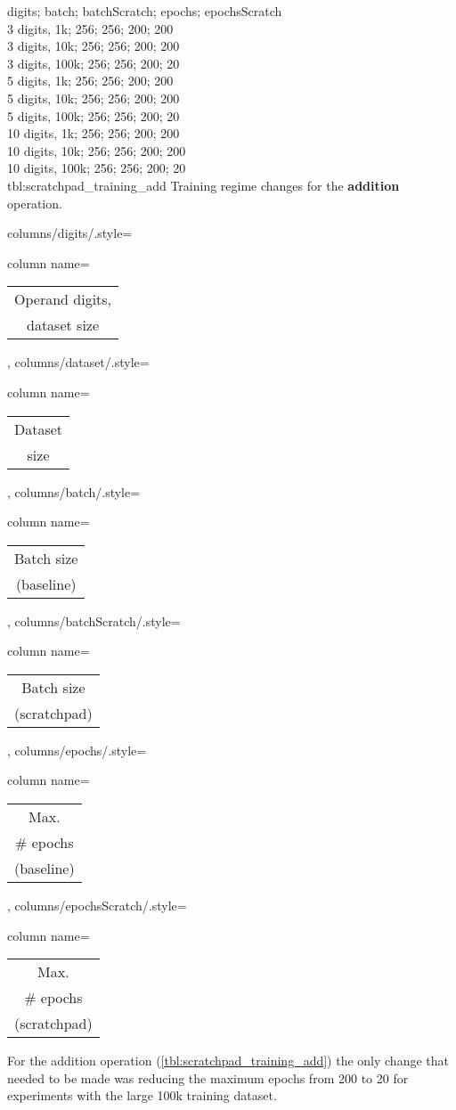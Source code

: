 {
    digits; batch; batchScratch; epochs; epochsScratch\\
    3 digits,  1k;  256; 256; 200; 200\\
    3 digits,  10k;  256; 256; 200; 200\\
    3 digits,  100k;  256; 256; 200; 20\\
    5 digits,  1k;  256; 256; 200; 200\\
    5 digits,  10k;  256; 256; 200; 200\\
    5 digits,  100k;  256; 256; 200; 20\\
    10 digits,  1k;  256; 256; 200; 200\\
    10 digits,  10k;  256; 256; 200; 200\\
    10 digits,  100k;  256; 256; 200; 20\\
}
{tbl:scratchpad_training_add}
{
    Training regime changes for the \textbf{addition} operation.
}
{%
    columns/digits/.style={column name={\begin{tabular}{c}
         Operand digits, \\
         dataset size
    \end{tabular}}},
    columns/dataset/.style={column name={\begin{tabular}{c}
         Dataset \\
         size
    \end{tabular}}},
    columns/batch/.style={column name={\begin{tabular}{c}
         Batch size \\
         (baseline)
    \end{tabular}}},
    columns/batchScratch/.style={column name={\begin{tabular}{c}
         Batch size \\
         (scratchpad)
    \end{tabular}}},
    columns/epochs/.style={column name={\begin{tabular}{c}
         Max. \\
         \# epochs \\
         (baseline)
    \end{tabular}}},
    columns/epochsScratch/.style={column name={\begin{tabular}{c}
         Max. \\
         \# epochs \\
         (scratchpad)
    \end{tabular}}}
}

For the addition operation (\cref{tbl:scratchpad_training_add}) the only change that needed to be made was reducing the maximum epochs from 200 to 20 for experiments with the large 100k training dataset.

